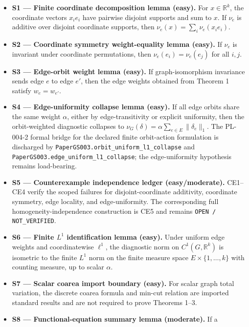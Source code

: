 \documentclass[
  11pt,
]{article}
\providecommand{\tightlist}{%
  \setlength{\itemsep}{0pt}\setlength{\parskip}{0pt}}
\providecommand{\tightlist}{%
  \setlength{\itemsep}{0pt}\setlength{\parskip}{0pt}}
\begin{document}
\begin{itemize}
\tightlist
\item
  \textbf{S1 --- Finite coordinate decomposition lemma (easy).} For
  \(x\in\mathbb R^k\), the coordinate vectors \(x_i e_i\) have pairwise
  disjoint supports and sum to \(x\). If \(\nu_e\) is additive over
  disjoint coordinate supports, then \(\nu_e(x)=\sum_i\nu_e(x_i e_i)\).
\item
  \textbf{S2 --- Coordinate symmetry weight-equality lemma (easy).} If
  \(\nu_e\) is invariant under coordinate permutations, then
  \(\nu_e(e_i)=\nu_e(e_j)\) for all \(i,j\).
\item
  \textbf{S3 --- Edge-orbit weight lemma (easy).} If graph-isomorphism
  invariance sends edge \(e\) to edge \(e'\), then the edge weights
  obtained from Theorem 1 satisfy \(w_e=w_{e'}\).
\item
  \textbf{S4 --- Edge-uniformity collapse lemma (easy).} If all edge
  orbits share the same weight \(\alpha\), either by edge-transitivity
  or explicit uniformity, then the orbit-weighted diagnostic collapses
  to \(\nu_G(\delta)=\alpha\sum_{e\in E}\|\delta_e\|_1\). The PL-004-2
  formal bridge for the declared finite orbit-action formulation is
  discharged by
  \texttt{PaperGS003.orbit\_\allowbreak{}uniform\_\allowbreak{}l1\_\allowbreak{}collapse}
  and
  \texttt{PaperGS003.edge\_\allowbreak{}uniform\_\allowbreak{}l1\_\allowbreak{}collapse};
  the edge-uniformity hypothesis remains load-bearing.
\item
  \textbf{S5 --- Counterexample independence ledger (easy/moderate).}
  CE1--CE4 verify the scoped failures for disjoint-coordinate
  additivity, coordinate symmetry, edge locality, and edge-uniformity.
  The corresponding full homogeneity-independence construction is CE5
  and remains \texttt{OPEN /\allowbreak{} NOT\_\allowbreak{}VERIFIED}.
\item
  \textbf{S6 --- Finite \(L^1\) identification lemma (easy).} Under
  uniform edge weights and coordinatewise \(\ell^1\), the diagnostic
  norm on \(C^1(G,\mathbb R^k)\) is isometric to the finite \(L^1\) norm
  on the finite measure space \(E\times\{1,\dots,k\}\) with counting
  measure, up to scalar \(\alpha\).
\item
  \textbf{S7 --- Scalar coarea import boundary (easy).} For scalar graph
  total variation, the discrete coarea formula and min-cut relation are
  imported standard results and are not required to prove Theorems 1--3.
\item
  \textbf{S8 --- Functional-equation summary lemma (moderate).} If a

\end{itemize}
\end{document}
